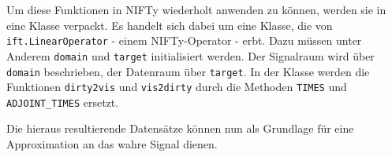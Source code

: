 Um diese Funktionen in NIFTy wiederholt anwenden zu können, werden sie in eine Klasse verpackt. Es handelt sich dabei um eine Klasse, die von \verb|ift.LinearOperator| - einem NIFTy-Operator - erbt. Dazu müssen unter Anderem \verb|domain| und \verb|target| initialisiert werden. Der Signalraum wird über \verb|domain| beschrieben, der Datenraum über \verb|target|. In der Klasse werden die Funktionen \verb|dirty2vis| und \verb|vis2dirty| durch die Methoden \verb|TIMES| und \verb|ADJOINT_TIMES| ersetzt.

Die hieraus resultierende Datensätze können nun als Grundlage für eine Approximation an das wahre Signal dienen.
